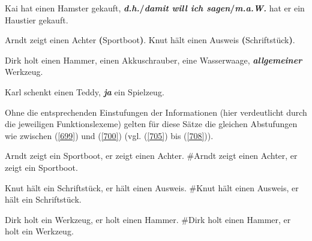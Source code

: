 \begin{exe}
	\ex\label{701} 
	Kai hat einen Hamster gekauft, \textbf{\textit{d.h.}/\textit{damit will ich sagen}/\textit{m.a.W.}} hat er ein Haustier 		gekauft.
\end{exe}
\vspace{-0.65cm}
\begin{exe}
	\ex\label{702} 
		\begin{xlist}	
			\ex\label{702a} Arndt zeigt einen Achter \textbf{(}Sportboot\textbf{)}.
			\ex\label{702b} Knut hält einen Ausweis \textbf{(}Schriftstück\textbf{)}.
		\end{xlist}
\end{exe}
\vspace{-0.65cm}
\begin{exe}
	\ex\label{703} 
	Dirk holt einen Hammer, einen Akkuschrauber, eine Wasserwaage, \textbf{\textit{allgemeiner}} Werkzeug.
\end{exe}
\vspace{-0.65cm}
\begin{exe}
	\ex\label{704} 
	Karl schenkt einen Teddy, \textbf{\textit{ja}} ein Spielzeug.
\end{exe}
Ohne die entsprechenden Einstufungen der Informationen (hier verdeutlicht durch die jeweiligen Funktionslexeme) gelten für diese Sätze die gleichen Abstufungen wie zwischen (\ref{699}) und (\ref{700}) (vgl. (\ref{705}) bis (\ref{708})).

\begin{exe}
	\ex\label{705} 
		\begin{xlist}	
			\ex\label{705a} Arndt zeigt ein Sportboot, er zeigt einen Achter.
			\ex\label{705b} \#Arndt zeigt einen Achter, er zeigt ein Sportboot.
		\end{xlist}
\end{exe}

\begin{exe}
	\ex\label{706} 
		\begin{xlist}	
			\ex\label{706a} Knut hält ein Schriftstück, er hält einen Ausweis.
			\ex\label{706b} \#Knut hält einen Ausweis, er hält ein Schriftstück.
		\end{xlist}
\end{exe}

\begin{exe}
	\ex\label{707} 
		\begin{xlist}	
			\ex\label{707a} Dirk holt ein Werkzeug, er holt einen Hammer.
			\ex\label{707b} \#Dirk holt einen Hammer, er holt ein Werkzeug.
		\end{xlist}
\end{exe}

